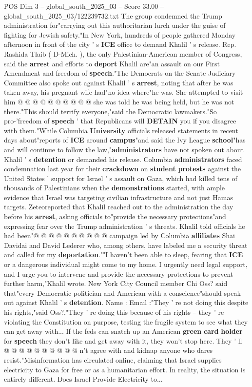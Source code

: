 \begin{textsample}{POS Dim 3 – global\_south\_2025\_03 – Score 33.00 – global\_south\_2025\_03/122239732.txt}
The group condemned the Trump administration for"carrying out this authoritarian lurch under the guise of fighting for Jewish safety."In New York, hundreds of people gathered Monday afternoon in front of the city ' s \textbf{ICE} office to demand Khalil ' s release.
Rep.
Rashida Tlaib ( D-Mich. ), the only Palestinian-American member of Congress, said the \textbf{arrest} and efforts to \textbf{deport} Khalil are"an assault on our First Amendment and freedom of \textbf{speech}."The Democrats on the Senate Judiciary Committee also spoke out against Khalil ' s \textbf{arrest}, noting that after he was taken away, his pregnant wife had"no idea where"he was.
She attempted to visit him @ @ @ @ @ @ @ @ @ @ she was told he was being held, but he was not there."This should terrify everyone,"said the Democratic lawmakers."So pro-'freedom of \textbf{speech} ' that Republicans will \textbf{DETAIN} you if you disagree with them."While Columbia \textbf{University} officials released statements in recent days about"reports of \textbf{ICE} around \textbf{campus}"and said the Ivy League \textbf{school}"has and will continue to follow the law,"\textbf{administrators} have not spoken out about Khalil ' s \textbf{detention} or demanded his release.
Columbia \textbf{administrators} faced condemnation last year for their \textbf{crackdown} on \textbf{student} \textbf{protests} against the United States ' support for Israel ' s assault on Gaza, which had killed tens of thousands of Palestinians when the \textbf{demonstrations} started, with ample evidence that Israel was targeting civilian infrastructure and not just Hamas targets.
Zeteoreported that Khalil reached out to the administration the day before his \textbf{arrest}, asking officials to"provide the necessary protections"and expressing fear over the Trump administration ' s threats.
Khalil told officials he had been"@ @ @ @ @ @ @ @ @ @ campaign led by Columbia \textbf{affiliates} Shai Davidai and David Lederer who, among others, have labeled me a security threat and called for my \textbf{deportation}.""I haven't been able to sleep, fearing that \textbf{ICE} or a dangerous individual might come to my home.
I urgently need legal support, and I urge you to intervene and provide the necessary protections to prevent further harm,"Khalil wrote.
New York City Council member Chi Oss? said that"every Democratic politician and American with a conscience"should speak out against Khalil ' s \textbf{detention}.
Name : Email :"They ' re not doing this despite his rights,"said Oss?."They ' re doing this because of his rights -- they ' re violating the Constitution on purpose, testing the fragile system to see what they can get away with...
If the feds can snatch up an American \textbf{green} \textbf{card} \textbf{holder} for \textbf{speech} they don't like and get away with it, they won't stop here.
They ' ll @ @ @ @ @ @ @ @ @ @ n't agree with and kidnap anyone who dares resist."Misinformation has circulated online, claiming that Israel supplies electricity to Gaza for free or as a humanitarian effort.
In reality, the situation is entirely different.
Does Israel Provide Electricity to...


\end{textsample}
